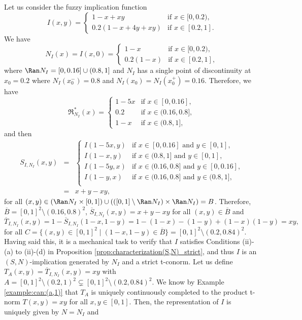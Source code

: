 \begin{example} Let us consider the fuzzy implication function
		$$
		I(x,y) =
		\left\{ \begin{array}{ll}
			1-x+xy &   \text{if }   x \in [0,0.2), \\
			0.2(1-x+4y+xy) &   \text{if }   x \in [0.2,1].
		\end{array} \right.
		$$
		We have
		$$
		N_{I}(x) = I(x,0) =
		\left\{ \begin{array}{ll}
			1-x &   \text{if }   x \in [0,0.2), \\
			0.2(1-x) &   \text{if }   x \in [0.2,1],
		\end{array} \right.
		$$
		where $\Ran N_{I} = [0,0.16] \cup (0.8,1]$ and $N_{I}$ has a single point of discontinuity at $x_0 =0.2$ where $N_{I}(x_0^{-})=0.8$ and $N_{I}(x_0)=N_{I}(x_0^{+})=0.16$. Therefore, we have
		$$
		\mathfrak{R}^*_{N_{I}}(x) =
		\left\{ \begin{array}{ll}
			1-5x &   \text{if }   x \in [0,0.16], \\
			0.2 &   \text{if }   x \in (0.16,0.8], \\
			1-x &   \text{if }   x \in (0.8,1],
		\end{array} \right.
		$$
		and then
		\begin{eqnarray*}
			S_{I,N_{I}}(x,y) 
			&=&  
			\left\{ \begin{array}{ll}
				I(1-5x,y) &   \text{if }   x \in [0,0.16] \text{ and } y \in [0,1], \\
				I(1-x,y) &   \text{if }   x \in (0.8,1] \text{ and } y \in [0,1], \\
				I(1-5y,x) &   \text{if }   x \in (0.16,0.8] \text{ and } y \in [0,0.16], \\
				I(1-y,x) &   \text{if }   x \in (0.16,0.8] \text{ and } y \in (0.8,1], \\
			\end{array} \right. \\
			&=&
			x+y-xy,
		\end{eqnarray*}
		for all $(x,y) \in (\Ran N_{I} \times [0,1]) \cup (([0,1] \setminus \Ran N_{I}) \times \Ran N_{I})=B$. Therefore, $\overline{B}=[0,1]^2 \setminus (0.16,0.8)^2$, $\overline{S}_{I,N_{I}}(x,y)=x+y-xy$ for all $(x,y) \in \overline{B}$ and
		$$\overline{T}_{I,N_{I}}(x,y) = 1-\overline{S}_{I,N_{I}}(1-x,1-y) = 1-(1-x)-(1-y)+(1-x)(1-y) = xy,
		$$
		for all $C=\{(x,y) \in [0,1]^2 \mid (1-x,1-y) \in \overline{B}\} =[0,1]^2 \setminus (0.2,0.84)^2$. Having said this, 
		it is a mechanical task to verify that $I$ satisfies Conditions (ii)-(a) to (ii)-(d) in Proposition \ref{prop:characterization(S,N)_strict}, and thus $I$ is an $(S,N)$-implication generated by $N_I$ and a strict t-conorm. Let us define  $T_A(x,y)=\overline{T}_{I,N_{I}}(x,y)=xy$ with $A= [0,1]^2 \setminus (0.2,1)^2 \subsetneq [0,1]^2 \setminus (0.2,0.84)^2$. We know by Example \ref{example:can:(a,1)} that $T_A$ is uniquely continuously completed to the product t-norm $T(x,y)=xy$ for all $x,y \in [0,1]$.  Then, the representation of $I$ is uniquely given by  $N=N_{I}$ and

\end{example}

